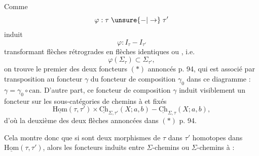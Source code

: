 
Comme 
\[
\varphi:\tau\mathrel{\unsure{-|\to}}\tau'
\]
induit
\[
\varphi:I_\tau\mathrel{-}I_{\tau'}
\]
transformant flèches rétrogrades en flèches identiques ou , i.e.
\[
\varphi(\Sigma_\tau)\subset\Sigma_{\tau'},
\]
on trouve le premier des deux foncteurs $(*)$ annoncés p. 94, qui est associé par transposition au foncteur $\gamma$
 du foncteur de composition $\gamma_0$ dans ce diagramme : $\gamma=\gamma_0\circ\mathrm{can}$. D'autre part, ce foncteur de composition $\gamma$ induit visiblement un foncteur sur les sous-catégories de chemins à   et   fixés
\[
\underline{\mathrm{Hom}}(\tau,\tau')\times\underline{\mathrm{Ch}}_{\Sigma,\tau'}(X;a,b)\mathrel{-}\underline{\mathrm{Ch}}_{\Sigma,\tau}(X;a,b),
\]
d'où la deuxième des deux flèches annoncées dans $(*)$ p. 94.

Cela montre donc que si
sont deux morphismes de $\tau$ dans $\tau'$ homotopes dans $\underline{\mathrm{Hom}}(\tau,\tau')$, alors les  foncteurs induits entre   $\Sigma$-chemins ou  $\Sigma$-chemins à   :

